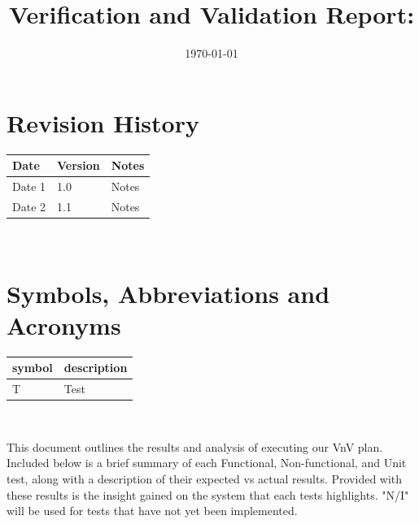 \documentclass[12pt, titlepage]{article}
\begin{document}
\title{Verification and Validation Report: \progname} 
\author{\authname}
\date{\today}
	
\maketitle


\section{Revision History}

\begin{tabularx}{\textwidth}{p{3cm}p{2cm}X}
\toprule {\bf Date} & {\bf Version} & {\bf Notes}\\
\midrule
Date 1 & 1.0 & Notes\\
Date 2 & 1.1 & Notes\\
\bottomrule
\end{tabularx}

~\newpage

\section{Symbols, Abbreviations and Acronyms}

\renewcommand{\arraystretch}{1.2}
\begin{tabular}{l l} 
  \toprule		
  \textbf{symbol} & \textbf{description}\\
  \midrule 
  T & Test\\
  \bottomrule
\end{tabular}\\


\newpage

\tableofcontents

\listoftables %

\listoffigures %

\newpage


This document outlines the results and analysis of executing our VnV plan. Included below is a brief summary of each Functional, Non-functional, and Unit test, along with a description of their expected vs actual results. Provided with these results is the insight gained on the system that each tests highlights. "N/I" will be used for tests that have not yet been implemented.  
\end{document}
